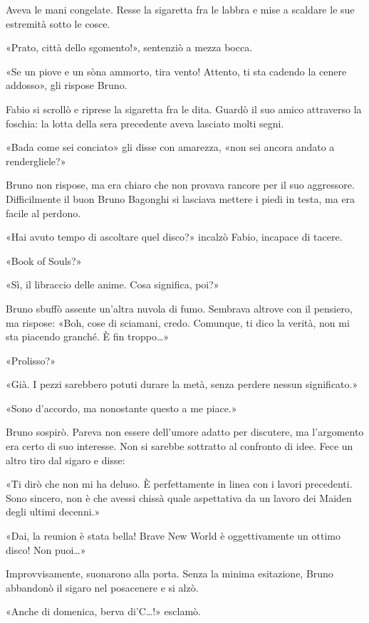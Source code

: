 Aveva le mani congelate. Resse la sigaretta fra le labbra e mise a scaldare le sue estremità sotto le cosce.

«Prato, città dello sgomento!», sentenziò a mezza bocca.

«Se \textsc{}un piove e \textsc{}un sòna ammorto, tira vento! Attento, ti sta cadendo la cenere addosso», gli rispose Bruno.

Fabio si scrollò e riprese la sigaretta fra le dita. Guardò il suo amico attraverso la foschia: la lotta della sera precedente aveva lasciato molti segni.

«Bada come sei conciato» gli disse con amarezza, «non sei ancora andato a rendergliele?»

Bruno non rispose, ma era chiaro che non provava rancore per il suo aggressore. Difficilmente il buon Bruno Bagonghi si lasciava mettere i piedi in testa, ma era facile al perdono.

«Hai avuto tempo di ascoltare quel disco?» incalzò Fabio, incapace di tacere.

«Book of Souls?»

«Sì, il libraccio delle anime. Cosa significa, poi?»

Bruno sbuffò assente un'altra nuvola di fumo. Sembrava altrove con il pensiero, ma rispose: «Boh, cose di sciamani, credo. Comunque, ti dico la verità, non mi sta piacendo granché. È fin troppo\ldots»

«Prolisso?»

«Già. I pezzi sarebbero potuti durare la metà, senza perdere nessun significato.»

«Sono d'accordo, ma nonostante questo a me piace.»

Bruno sospirò. Pareva non essere dell'umore adatto per discutere, ma l'argomento era certo di suo interesse. Non si sarebbe sottratto al confronto di idee. Fece un altro tiro dal sigaro e disse:

«Ti dirò che non mi ha deluso. È perfettamente in linea con i lavori precedenti. Sono sincero, non è che avessi chissà quale aspettativa da un lavoro dei Maiden degli ultimi decenni.»

«Dai, la reunion è stata bella! Brave New World è oggettivamente un ottimo disco! Non puoi\ldots»

Improvvisamente, suonarono alla porta. Senza la minima esitazione, Bruno abbandonò il sigaro nel posacenere e si alzò.

«Anche di domenica, berva di'C\ldots!» esclamò.

